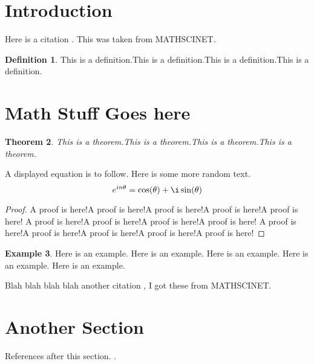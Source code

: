 \documentclass[12 pt]{article}
\theoremstyle{plain}
\newtheorem{theorem}{Theorem}[section]
\theoremstyle{definition}
\newtheorem{definition}[theorem]{Definition}
\newtheorem{example}[theorem]{Example}
\begin{document}
\restoregeometry %
\section{Introduction}
\lipsum[1-2]%
Here is a citation \cite{Paulsen}. This was taken from MATHSCINET.
\begin{definition} 
This is a definition.This is a definition.This is a definition.This is a definition.
\end{definition}
\section{Math Stuff Goes here}
\lipsum[3-4]
\begin{theorem}
This is a theorem.This is a theorem.This is a theorem.This is a theorem.
\end{theorem}
\lipsum[4]%
 A displayed equation is to follow. Here is some more random text. 
\[e^{in\theta}=\cos(\theta)+\i \sin(\theta)\]
\lipsum[5]
\begin{proof}
A proof is here!A proof is here!A proof is here!A proof is here!A proof is here!
A proof is here!A proof is here!A proof is here!A proof is here!
A proof is here!A proof is here!A proof is here!A proof is here!A proof is here!
\end{proof}
\lipsum[5-9]
\begin{example}
Here is an example. Here is an example. Here is an example. Here is an example. Here is an example. 
\end{example}
Blah blah blah blah another citation \cite{Dritschel}, I got these from MATHSCINET. 
\lipsum[4-5]
\section{Another Section}
References after this section.  \lipsum[6]. 
\newpage
\end{document}
